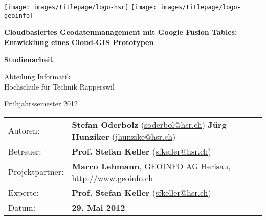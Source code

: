 \begin{titlepage}

\texttt{[image: images/titlepage/logo-hsr]}
\hfill
\texttt{[image: images/titlepage/logo-geoinfo]}
\vspace{2.2cm}

\begin{center}
{ \Large
	\textbf{Cloudbasiertes Geodatenmanagement mit Google Fusion Tables: Entwicklung eines Cloud-GIS Prototypen}
	\vspace{1cm}

	\textbf{Studienarbeit}
	\vspace{1cm}

	Abteilung Informatik \\[0.2cm]
	Hochschule für Technik Rapperswil
	\vspace{1cm}

	Frühjahrssemester 2012
}
\end{center}
\vspace{2.3cm}

\begin{tabular}{p{0.19\twocelltabwidth}p{0.81\twocelltabwidth}}
Autoren: & \textbf{Stefan Oderbolz} (\url{soderbol@hsr.ch}) \newline
 \textbf{Jürg Hunziker} (\url{jhunzike@hsr.ch}) \\ 
Betreuer: & \textbf{Prof. Stefan Keller} (\url{sfkeller@hsr.ch}) \\ 
Projektpartner: & \textbf{Marco Lehmann}, GEOINFO AG Herisau, \url{http://www.geoinfo.ch} \\ 
Experte: & \textbf{Prof. Stefan Keller} (\url{sfkeller@hsr.ch}) \\ 
Datum: & \textbf{29. Mai 2012} \\ 
\end{tabular}

\end{titlepage}